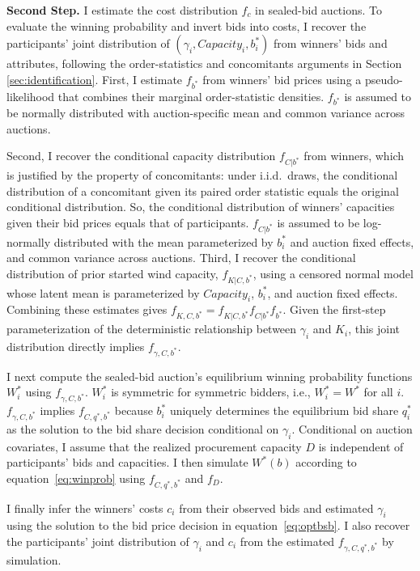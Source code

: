 \documentclass[12pt]{article}
\theoremstyle{definition} %
\begin{document}
\textbf{Second Step.} I estimate the cost distribution $f_c$ in sealed-bid auctions. To evaluate the winning probability and invert bids into costs, I recover the participants' joint distribution of $(\gamma_i,Capacity_i,b_i^\ast) $ from winners' bids and attributes, following the order-statistics and concomitants arguments in Section \ref{sec:identification}. First, I estimate $f_{b^\ast} $ from winners' bid prices using a pseudo-likelihood that combines their marginal order-statistic densities. $f_{b^\ast} $ is assumed to be normally distributed with auction-specific mean and common variance across auctions.

Second, I recover the conditional capacity distribution $f_{C|b^\ast}$ from winners, which is justified by the property of concomitants: under i.i.d.\ draws, the conditional distribution of a concomitant given its paired order statistic equals the original conditional distribution. So, the conditional distribution of winners' capacities given their bid prices equals that of participants. $f_{C|b^\ast}$ is assumed to be log-normally distributed with the mean parameterized by $b_i^\ast$ and auction fixed effects, and common variance across auctions. Third, I recover the conditional distribution of prior started wind capacity, $f_{K|C,b^\ast}$, using a censored normal model whose latent mean is parameterized by $Capacity_i$, $b_i^\ast$, and auction fixed effects. Combining these estimates gives $f_{K,C,b^\ast}=f_{K|C,b^\ast}f_{C|b^\ast}f_{b^\ast}$. Given the first-step parameterization of the deterministic relationship between $\gamma_i$ and $K_i$, this joint distribution directly implies $f_{\gamma,C,b^\ast}$.

I next compute the sealed-bid auction's equilibrium winning probability functions $W_i^\ast $ using $f_{\gamma,C,b^\ast}$. $W_i^\ast $ is symmetric for symmetric bidders, i.e., $W_i^\ast = W^\ast $ for all $i$. $f_{\gamma,C,b^\ast}$ implies $f_{C,q^\ast,b^\ast}$ because $b_i^\ast $ uniquely determines the equilibrium bid share $q_i^\ast $ as the solution to the bid share decision conditional on $\gamma_i $. Conditional on auction covariates, I assume that the realized procurement capacity $D$ is independent of participants' bids and capacities. I then simulate $W^\ast(b) $ according to equation~\eqref{eq:winprob} using $f_{C,q^\ast,b^\ast}$ and $f_D$.

I finally infer the winners' costs $c_i $ from their observed bids and estimated $\gamma_i $ using the solution to the bid price decision in equation~\eqref{eq:optbsb}. I also recover the participants' joint distribution of $\gamma_i $ and $c_i $ from the estimated $f_{\gamma,C,q^\ast,b^\ast} $ by simulation.
\end{document}
